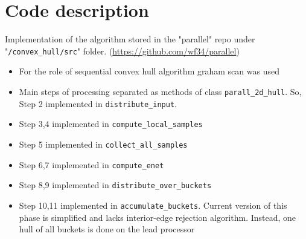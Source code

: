 \documentclass[a4paper]{article}
\begin{document}
\section {Code description}
    Implementation of the algorithm stored in the "parallel" repo under "\verb|/convex_hull/src|" folder. (\url{https://github.com/wf34/parallel})
     \begin {itemize}
         \item For the role of sequential convex hull algorithm graham scan was used
         \item Main steps of processing separated as methods of class \verb|parall_2d_hull|. So, Step 2 implemented in \verb|distribute_input|. 
         \item Step 3,4 implemented in \verb|compute_local_samples|
         \item Step 5 implemented in \verb|collect_all_samples|
         \item Step 6,7 implemented in \verb|compute_enet|
         \item Step 8,9 implemented in \verb|distribute_over_buckets|
         \item Step 10,11  implemented in \verb|accumulate_buckets|. Current version of this phase is simplified and lacks interior-edge rejection algorithm. Instead, one hull of all buckets is done on the lead processor
     \end {itemize}
\end{document}
